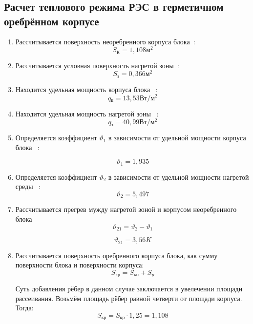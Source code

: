 \subsection{Расчет теплового режима РЭС в герметичном оребрённом
  корпусе}
\begin{enumerate}[label={\arabic*.}]

\item Рассчитывается поверхность неоребренного корпуса
  блока~\cite{Rotkop1976}: %
  $$S\mathrm{_{К}}=1,108\mathrm{м^2}$$

\item Рассчитывается условная поверхность нагретой
  зоны~\cite{Rotkop1976}: %
  $$S\mathrm{_{з}} = 0,366\mathrm{м^2}$$ 

\item Находится удельная мощность корпуса
  блока ~\cite{Rotkop1976}:  %
  $$q\mathrm{_к} = 13,53\mathrm{Вт/м^2}$$

\item Находится удельная мощность нагретой
  зоны ~\cite{Rotkop1976}: %
  $$q\mathrm{_з} = 40,99 \mathrm{ Вт/м^2}$$

\item Определяется коэффициент $\vartheta_1$ в зависимости от
  удельной мощности корпуса блока ~\cite{Rotkop1976}:

  $$\vartheta_1=1,935$$
\item Определяется коэффициент $\vartheta_2$ в зависимости от удельной мощности нагретой среды ~\cite{Rotkop1976}:
  $$\vartheta_2=5,497$$

  \item Рассчитывается прегрев мужду нагретой зоной и корпусом
неоребренного блока
\begin{equation}
  \vartheta_{21} = \vartheta_2 - \vartheta_1
\end{equation}

$$\vartheta_{21} = 3,56 K$$

\item Рассчитывается поверхность оребренного корпуса блока,
  как сумму поверхности блока и поверхности корпуса:
  \begin{equation}
    S\mathrm{_{кр}} = S\mathrm{_{кн}} + S_{p}
  \end{equation}

Суть добавления рёбер в данном случае заключается в увелечении площади
рассеивания. Возьмём площадь рёбер равной четверти от площади
корпуса. Тогда:
$$S\mathrm{_{кр}} = S\mathrm{_{кр}} \cdot 1,25 = 1,108$$


\end{enumerate}
